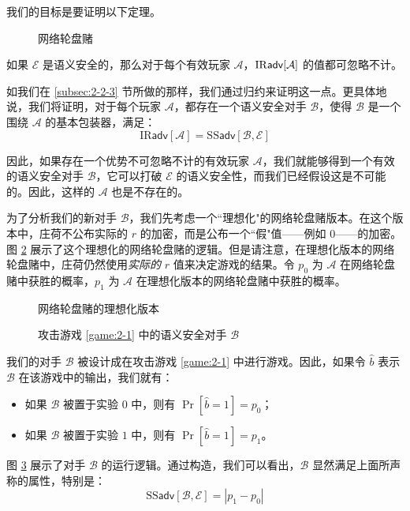 我们的目标是要证明以下定理。

\begin{figure}
	\centering
	
	\caption{网络轮盘赌}
	\label{fig:2-2}
\end{figure}

\begin{theorem}
如果 $\mathcal{E}$ 是语义安全的，那么对于每个有效玩家 $\mathcal{A}$，${\rm IR\mathsf{adv}}[\mathcal{A}]$ 的值都可忽略不计。
\end{theorem}

\vspace{5pt}

如我们在 \ref{subsec:2-2-3} 节所做的那样，我们通过归约来证明这一点。更具体地说，我们将证明，对于每个玩家 $\mathcal{A}$，都存在一个语义安全对手 $\mathcal{B}$，使得 $\mathcal{B}$ 是一个围绕 $\mathcal{A}$ 的基本包装器，满足：
\begin{equation}\label{eq:2-7}
\mathrm{IR}\mathsf{adv}[\mathcal{A}]
=
\mathrm{SS}\mathsf{adv}[\mathcal{B},\mathcal{E}]
\end{equation}

因此，如果存在一个优势不可忽略不计的有效玩家 $\mathcal{A}$，我们就能够得到一个有效的语义安全对手 $\mathcal{B}$，它可以打破 $\mathcal{E}$ 的语义安全性，而我们已经假设这是不可能的。因此，这样的 $\mathcal{A}$ 也是不存在的。

为了分析我们的新对手 $\mathcal{B}$，我们先考虑一个``理想化"的网络轮盘赌版本。在这个版本中，庄荷不公布实际的 $r$ 的加密，而是公布一个``假"值——例如 $0$——的加密。图 \ref{fig:2-3} 展示了这个理想化的网络轮盘赌的逻辑。但是请注意，在理想化版本的网络轮盘赌中，庄荷仍然使用\emph{实际的} $r$ 值来决定游戏的结果。令 $p_0$ 为 $\mathcal{A}$ 在网络轮盘赌中获胜的概率，$p_1$ 为 $\mathcal{A}$ 在理想化版本的网络轮盘赌中获胜的概率。

\begin{figure}
	\centering
	
	\caption{网络轮盘赌的理想化版本}
	\label{fig:2-3}
\end{figure}

\begin{figure}
	\centering
	
	\caption{攻击游戏 \ref{game:2-1} 中的语义安全对手 $\mathcal{B}$}
	\label{fig:2-4}
\end{figure}

我们的对手 $\mathcal{B}$ 被设计成在攻击游戏 \ref{game:2-1} 中进行游戏。因此，如果令 $\hat b$ 表示 $\mathcal{B}$ 在该游戏中的输出，我们就有：
\begin{itemize}
	\item 如果 $\mathcal{B}$ 被置于实验 $0$ 中，则有 $\Pr[\hat b=1]=p_0$；
	\item 如果 $\mathcal{B}$ 被置于实验 $1$ 中，则有 $\Pr[\hat b=1]=p_1$。
\end{itemize}
图 \ref{fig:2-4} 展示了对手 $\mathcal{B}$ 的运行逻辑。通过构造，我们可以看出，$\mathcal{B}$ 显然满足上面所声称的属性，特别是：
\begin{equation}\label{eq:2-8}
\mathrm{SS}\mathsf{adv}[\mathcal{B},\mathcal{E}]
=
|p_1-p_0|
\end{equation}

